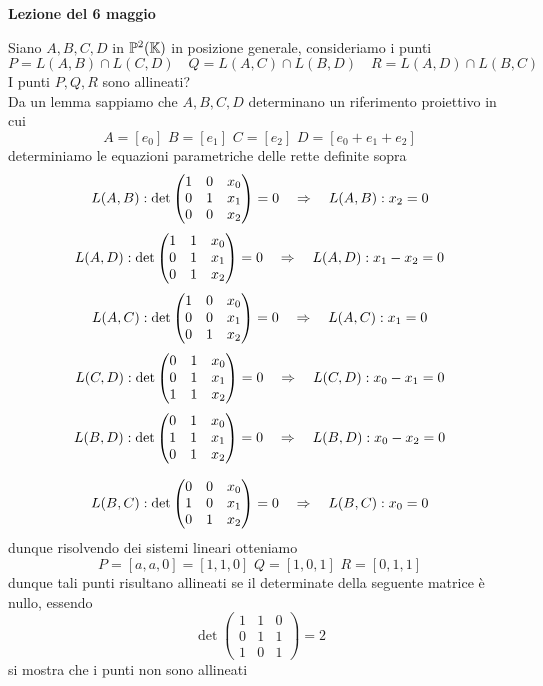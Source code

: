 

\textbf{Lezione del 6 maggio}
\begin{ese}\label{ex1} Siano $A,B,C,D$ in $\mathbb{P}^2( \mathbb{K})$ in posizione generale, consideriamo i punti
$$ P=L(A,B) \cap L(C,D) \quad Q = L(A,C) \cap L(B,D) \quad R=L(A,D) \cap L(B,C)$$
I punti $P,Q,R$ sono allineati?\\
Da un lemma sappiamo che $A,B,C,D$ determinano un riferimento proiettivo in cui
$$ A=[e_0] \, \, B=[e_1] \, \, C=[e_2]\, \, D=[e_0+e_1+e_2]$$
determiniamo le equazioni parametriche delle rette definite sopra
$$ L(A,B) :  \det \begin{pmatrix} 1 & 0 & x_0 \\
													 0 & 1 & x_1\\
 													0 & 0 & x_2
\end{pmatrix} =0 \quad \Rightarrow \quad 
L(A,B) : x_2=0$$
$$ L(A,D) :  \det \begin{pmatrix} 1 & 1 & x_0 \\
													 0 & 1 & x_1\\
 													0 & 1 & x_2
\end{pmatrix} =0 \quad \Rightarrow \quad 
L(A,D) : x_1-x_2=0$$
$$ L(A,C) :  \det \begin{pmatrix} 1 & 0 & x_0 \\
													 0 & 0 & x_1\\
 													0 & 1 & x_2
\end{pmatrix} =0 \quad \Rightarrow \quad 
L(A,C) : x_1=0$$
$$ L(C,D) :  \det \begin{pmatrix} 0 & 1 & x_0 \\
													 0 & 1 & x_1\\
 													1 & 1 & x_2
\end{pmatrix} =0 \quad \Rightarrow \quad 
L(C,D) : x_0-x_1=0$$
$$ L(B,D) :  \det \begin{pmatrix} 0 & 1 & x_0 \\
													 1 & 1 & x_1\\
 													0 & 1 & x_2
\end{pmatrix} =0 \quad \Rightarrow \quad 
L(B,D) : x_0- x_2=0$$

$$ L(B,C) :  \det \begin{pmatrix} 0 & 0 & x_0 \\
													 1 & 0 & x_1\\
 													 0 & 1 & x_2
\end{pmatrix} =0 \quad \Rightarrow \quad 
L(B,C) : x_0=0$$
dunque risolvendo dei sistemi lineari otteniamo 
$$ P=[a,a,0] =[1,1,0] \, \, Q = [ 1, 0 , 1] \, \, R =[0,1,1]$$
dunque tali punti risultano allineati se il determinate della seguente matrice \`e nullo, essendo
$$ \det \begin{pmatrix}
1 & 1 & 0 \\
0 & 1 & 1 \\
1 & 0 &1 
\end{pmatrix}=2$$ 
si mostra che i punti non sono allineati 
\end{ese}
